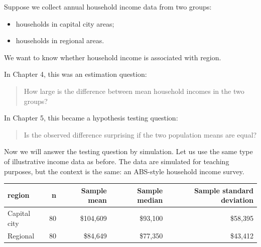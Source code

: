 \documentclass[
  letterpaper,
  DIV=11,
  numbers=noendperiod]{scrreprt}
\providecommand{\tightlist}{%
  \setlength{\itemsep}{0pt}\setlength{\parskip}{0pt}}
\begin{document}
\begin{tcolorbox}[enhanced jigsaw, arc=.35mm, bottomrule=.15mm, bottomtitle=1mm, breakable, colback=white, colbacktitle=quarto-callout-note-color!10!white, colframe=quarto-callout-note-color-frame, coltitle=black, left=2mm, leftrule=.75mm, opacityback=0, opacitybacktitle=0.6, rightrule=.15mm, title=\textcolor{quarto-callout-note-color}{\faInfo}\hspace{0.5em}{Household income in capital city and regional areas}, titlerule=0mm, toprule=.15mm, toptitle=1mm]

Suppose we collect annual household income data from two groups:

\begin{itemize}
\tightlist
\item
  households in capital city areas;
\item
  households in regional areas.
\end{itemize}

We want to know whether household income is associated with region.

\end{tcolorbox}

In Chapter 4, this was an estimation question:

\begin{quote}
How large is the difference between mean household incomes in the two
groups?
\end{quote}

In Chapter 5, this became a hypothesis testing question:

\begin{quote}
Is the observed difference surprising if the two population means are
equal?
\end{quote}

Now we will answer the testing question by simulation. Let us use the
same type of illustrative income data as before. The data are simulated
for teaching purposes, but the context is the same: an ABS-style
household income survey.

\begin{table}
\fontsize{12.0pt}{14.0pt}\selectfont
\begin{tabular*}{\linewidth}{@{\extracolsep{\fill}}lrrrr}
\toprule
region & n & Sample mean & Sample median & Sample standard deviation \\ 
\midrule\addlinespace[2.5pt]
Capital city & 80 & \$104,609 & \$93,100 & \$58,395 \\ 
Regional & 80 & \$84,649 & \$77,350 & \$43,412 \\ 
\bottomrule
\end{tabular*}
\end{table}
\end{document}
